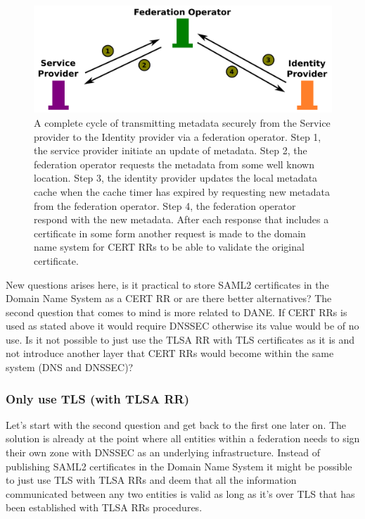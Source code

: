 \begin{figure}[ht]
\begin{center}
\includegraphics[scale=1]{Figures/saml2certsascertrr.png}
\end{center}
\caption{A complete cycle of transmitting metadata securely from the Service provider to the Identity provider via a federation operator.
Step 1, the service provider initiate an update of metadata.
Step 2, the federation operator requests the metadata from some well known location.
Step 3, the identity provider updates the local metadata cache when the cache timer has expired by requesting new metadata from the federation operator.
Step 4, the federation operator respond with the new metadata.
After each response that includes a certificate in some form another request is made to the domain name system for CERT RRs to be able to validate the original certificate.
\label{ch4:saml2certsascertrr}}
\end{figure}



New questions arises here, is it practical to store SAML2 certificates in the Domain Name System as a CERT RR 
or are there better alternatives?
The second question that comes to mind is more related to DANE.
If CERT RRs is used as stated above it would require DNSSEC otherwise its value would be of no use.
Is it not possible to just use the TLSA RR with TLS certificates as it is and not introduce another layer that CERT RRs would become within the same system (DNS and DNSSEC)?

\subsubsection{Only use TLS (with TLSA RR)}
\label{subsec:only-tlsa-rr-with-tls}
Let's start with the second question and get back to the first one later on.
The solution is already at the point where all entities within a federation needs to sign their own zone with DNSSEC as an underlying infrastructure.
Instead of publishing SAML2 certificates in the Domain Name System it might be possible to just use TLS with TLSA RRs and deem that all the information communicated between any two entities is valid as long as it's over TLS that has been established with TLSA RRs procedures.

